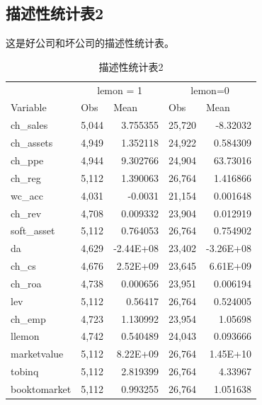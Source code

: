 \documentclass{article}
\begin{document}
\subsection{描述性统计表2} %
\label{sub:描述性统计表2} 
\par 这是好公司和坏公司的描述性统计表。
\begin{table}[H]
  \centering
  \caption{描述性统计表2}
    \begin{tabular}{lrrrr} \hline\hline
          & \multicolumn{2}{c}{lemon = 1} & \multicolumn{2}{c}{lemon=0} \\
    \cmidrule{2-5}    Variable & \multicolumn{1}{l}{Obs} & \multicolumn{1}{l}{Mean} & \multicolumn{1}{l}{Obs} & \multicolumn{1}{l}{Mean} \\
    ch\_sales & 5,044 & 3.755355 & 25,720 & -8.32032 \\
    ch\_assets & 4,949 & 1.352118 & 24,922 & 0.584309 \\
    ch\_ppe & 4,944 & 9.302766 & 24,904 & 63.73016 \\
    ch\_reg & 5,112 & 1.390063 & 26,764 & 1.416866 \\
    wc\_acc & 4,031 & -0.0031 & 21,154 & 0.001648 \\
    ch\_rev & 4,708 & 0.009332 & 23,904 & 0.012919 \\
    soft\_asset & 5,112 & 0.764053 & 26,764 & 0.754902 \\
    da    & 4,629 & -2.44E+08 & 23,402 & -3.26E+08 \\
    ch\_cs & 4,676 & 2.52E+09 & 23,645 & 6.61E+09 \\
    ch\_roa & 4,738 & 0.000656 & 23,951 & 0.006194 \\
    lev   & 5,112 & 0.56417 & 26,764 & 0.524005 \\
    ch\_emp & 4,723 & 1.130992 & 23,954 & 1.05698 \\
    llemon & 4,742 & 0.540489 & 24,043 & 0.093666 \\
    marketvalue & 5,112 & 8.22E+09 & 26,764 & 1.45E+10 \\
    tobinq & 5,112 & 2.819399 & 26,764 & 4.33967 \\
    booktomarket & 5,112 & 0.993255 & 26,764 & 1.051638 \\ \hline\hline
    \end{tabular}%
  \label{tab:描述性统计表2}%
\end{table}%

\end{document}
